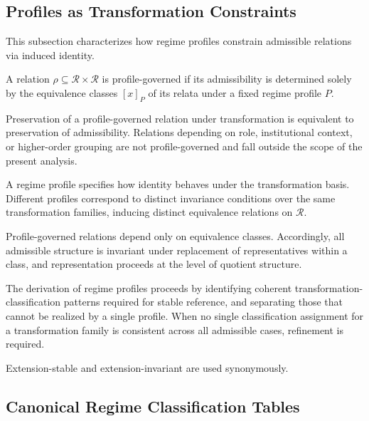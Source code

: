 \subsection{Profiles as Transformation Constraints}
\label{subsec:profiles_as_constraints}

This subsection characterizes how regime profiles
constrain admissible relations via induced identity.

\begin{definition}
\label{def:profile_governed_relation}
A relation $\rho \subseteq \mathcal{R} \times \mathcal{R}$ is profile-governed
if its admissibility is determined solely by the equivalence
classes $[x]_P$ of its relata under a fixed regime profile $P$.
\end{definition}


Preservation of a profile-governed relation under transformation
is equivalent to preservation of admissibility.
Relations depending on role, institutional context, or higher-order grouping
are not profile-governed and fall outside the scope of the present analysis.



A regime profile specifies how identity behaves under the transformation basis.
Different profiles correspond to distinct invariance conditions
over the same transformation families,
inducing distinct equivalence relations on $\mathcal{R}$.



Profile-governed relations depend only on equivalence classes.
Accordingly, all admissible structure is invariant under replacement
of representatives within a class, and representation proceeds
at the level of quotient structure.



The derivation of regime profiles proceeds by identifying coherent
transformation-classification patterns required for stable reference,
and separating those that cannot be realized by a single profile.
When no single classification assignment for a transformation family
is consistent across all admissible cases,
refinement is required.



Extension-stable and extension-invariant are used synonymously.

\subsection{Canonical Regime Classification Tables}
\label{subsec:canonical_classifications}

